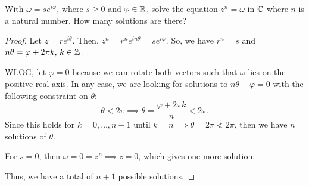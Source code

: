 \documentclass[../hw1]{subfiles}
\begin{document}
\begin{problem}
With $\omega = se^{i\varphi}$, where $s\ge 0$ and $\varphi \in \mathbb{R}$, solve the equation $z^n = \omega$ in $\mathbb{C}$ where $n$ is a natural number.
How many solutions are there?
\end{problem}
\begin{proof}
	Let $z=re^{i\theta}$.
	Then, $z^n = r^n e^{in\theta} = se^{i\varphi}$.
	So, we have $r^n = s$ and  $n\theta = \varphi+2\pi k,\, k\in \mathbb{Z}$.

	WLOG, let $\varphi=0$ because we can rotate both vectors such that  $\omega$ lies on the positive real axis.
	In any case, we are looking for solutions to $n\theta-\varphi=0$ with the following constraint on $\theta$: \[
		\theta < 2\pi \implies \theta = \frac{\varphi+2\pi k}{n}<2\pi
		.\]
	Since this holds for $k=0,\ldots,n-1$ until $k=n \implies \theta = 2\pi \not< 2\pi$, then we have $n$ solutions of $\theta$.

	For $s=0$, then $\omega = 0 = z^n \implies z = 0$, which gives one more solution.

	Thus, we have a total of $n+1$ possible solutions.
\end{proof}
\end{document}
